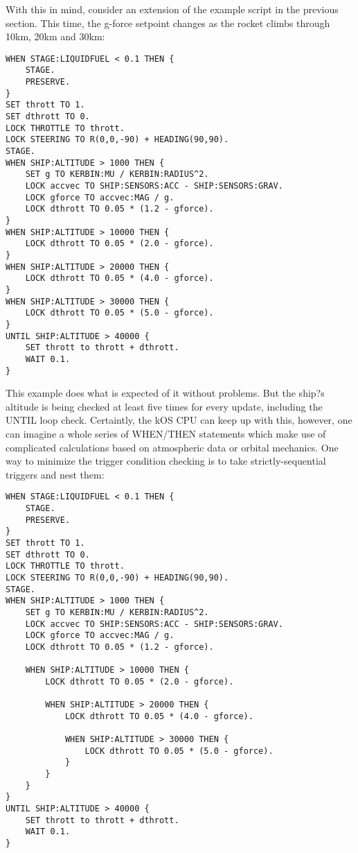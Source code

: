 With this in mind, consider an extension of the example script in the previous section. This time, the g-force setpoint changes as the rocket climbs through 10km, 20km and 30km:

\begin{Verbatim}[frame=single]
WHEN STAGE:LIQUIDFUEL < 0.1 THEN {
    STAGE.
    PRESERVE.
}
SET thrott TO 1.
SET dthrott TO 0.
LOCK THROTTLE TO thrott.
LOCK STEERING TO R(0,0,-90) + HEADING(90,90).
STAGE.
WHEN SHIP:ALTITUDE > 1000 THEN {
    SET g TO KERBIN:MU / KERBIN:RADIUS^2.
    LOCK accvec TO SHIP:SENSORS:ACC - SHIP:SENSORS:GRAV.
    LOCK gforce TO accvec:MAG / g.
    LOCK dthrott TO 0.05 * (1.2 - gforce).
}
WHEN SHIP:ALTITUDE > 10000 THEN {
    LOCK dthrott TO 0.05 * (2.0 - gforce).
}
WHEN SHIP:ALTITUDE > 20000 THEN {
    LOCK dthrott TO 0.05 * (4.0 - gforce).
}
WHEN SHIP:ALTITUDE > 30000 THEN {
    LOCK dthrott TO 0.05 * (5.0 - gforce).
}
UNTIL SHIP:ALTITUDE > 40000 {
    SET thrott to thrott + dthrott.
    WAIT 0.1.
}
\end{Verbatim} 

This example does what is expected of it without problems. But the ship?s altitude is being checked at least five times for every update, including the UNTIL loop check. Certaintly, the kOS CPU can keep up with this, however, one can imagine a whole series of WHEN/THEN statements which make use of complicated calculations based on atmospheric data or orbital mechanics. One way to minimize the trigger condition checking is to take strictly-sequential triggers and nest them:

\begin{Verbatim}[frame=single]
WHEN STAGE:LIQUIDFUEL < 0.1 THEN {
    STAGE.
    PRESERVE.
}
SET thrott TO 1.
SET dthrott TO 0.
LOCK THROTTLE TO thrott.
LOCK STEERING TO R(0,0,-90) + HEADING(90,90).
STAGE.
WHEN SHIP:ALTITUDE > 1000 THEN {
    SET g TO KERBIN:MU / KERBIN:RADIUS^2.
    LOCK accvec TO SHIP:SENSORS:ACC - SHIP:SENSORS:GRAV.
    LOCK gforce TO accvec:MAG / g.
    LOCK dthrott TO 0.05 * (1.2 - gforce).

    WHEN SHIP:ALTITUDE > 10000 THEN {
        LOCK dthrott TO 0.05 * (2.0 - gforce).

        WHEN SHIP:ALTITUDE > 20000 THEN {
            LOCK dthrott TO 0.05 * (4.0 - gforce).

            WHEN SHIP:ALTITUDE > 30000 THEN {
                LOCK dthrott TO 0.05 * (5.0 - gforce).
            }
        }
    }
}
UNTIL SHIP:ALTITUDE > 40000 {
    SET thrott to thrott + dthrott.
    WAIT 0.1.
}
\end{Verbatim} 

